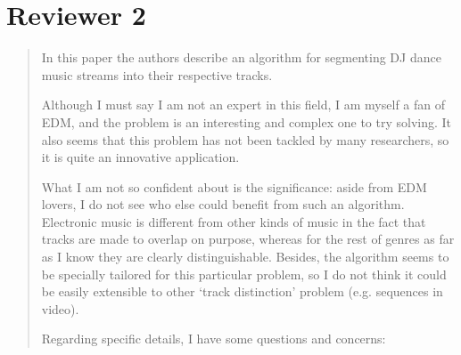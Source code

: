\documentclass[12pt,a4paper,twoside,final,onecolumn]{article}
\begin{document}
\section{Reviewer 2}

\begin{quote} 

In this paper the authors describe an algorithm for segmenting DJ dance music streams into their respective tracks.

Although I must say I am not an expert in this field, I am myself a fan of EDM, and the problem is an interesting and complex one to try solving. It also seems that this problem has not been tackled by many researchers, so it is quite an innovative application. 

What I am not so confident about is the significance: aside from EDM lovers, I do not see who else could benefit from such an algorithm. Electronic music is different from other kinds of music in the fact that tracks are made to overlap on purpose, whereas for the rest of genres as far as I know they are clearly distinguishable. Besides, the algorithm seems to be specially tailored for this particular problem, so I do not think it could be easily extensible to other `track distinction' problem (e.g. sequences in video).

Regarding specific details, I have some questions and concerns:

\end{quote}
	
\end{document}
